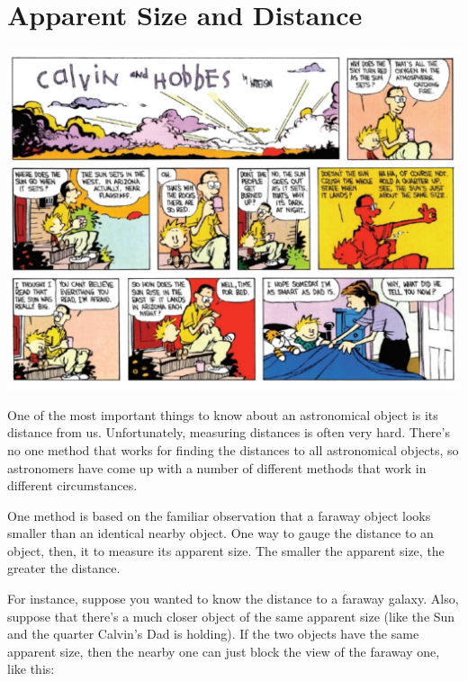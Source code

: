 \section{Apparent Size and Distance}

\makelabheader %

\answerspace{0.5in}
\centerline{\includegraphics[width=\textwidth]{localdistance/calvin-sun-color.pdf}}
\answerspace{0.5in}

One of the most important things to know about an astronomical
object is its distance from us.  Unfortunately, measuring distances
is often very hard.  There's no one method that works for
finding the distances to all astronomical objects, so 
astronomers have come up with a number of different
methods that work in different circumstances.

One method is based on the familiar observation that a 
faraway object looks smaller than an identical nearby object.
One way to gauge the distance to an object, then, it to measure
its apparent size.  The smaller the apparent size, the greater
the distance.

\pagebreak[4]

For instance, suppose you wanted to know the distance to a faraway
galaxy.  Also, suppose that there's a much closer object of the
same apparent size (like the Sun and the quarter Calvin's Dad is holding).
If the two objects have the same apparent size, then the nearby one
can just block the view of the faraway one, like this:

